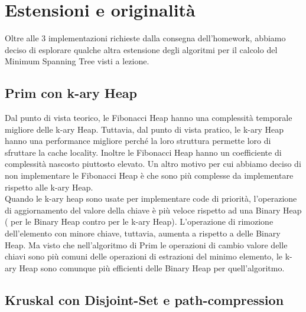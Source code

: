 \section{Estensioni e originalità}
\label{cap:extensions-and-originalities}

Oltre alle 3 implementazioni richieste dalla consegna dell'homework, abbiamo deciso di esplorare qualche altra estensione degli algoritmi per il calcolo del Minimum Spanning Tree visti a lezione.

\subsection{Prim con k-ary Heap}


Dal punto di vista teorico, le Fibonacci Heap hanno una complessità temporale migliore delle k-ary Heap.
Tuttavia, dal punto di vista pratico, le k-ary Heap hanno una performance migliore perché la loro struttura permette loro di sfruttare la cache locality. Inoltre le Fibonacci Heap hanno un coefficiente di complessità nascosto piuttosto elevato.
Un altro motivo per cui abbiamo deciso di non implementare le Fibonacci Heap è che sono più complesse da implementare rispetto alle k-ary Heap. \\

\noindent Quando le k-ary heap sono usate per implementare code di priorità, l'operazione di aggiornamento del valore della chiave è più veloce rispetto ad una Binary Heap (\complexityLogN{} per le Binary Heap contro \complexityLogkN{} per le k-ary Heap).
L'operazione di rimozione dell'elemento con minore chiave, tuttavia, aumenta a \complexityKLogkN{} rispetto a \complexityLogkN{} delle Binary Heap. Ma visto che nell'algoritmo di Prim le operazioni di cambio valore delle chiavi sono più comuni delle operazioni di estrazioni del minimo elemento, le k-ary Heap sono comunque più efficienti delle Binary Heap per quell'algoritmo.

\subsection{Kruskal con Disjoint-Set e path-compression}

